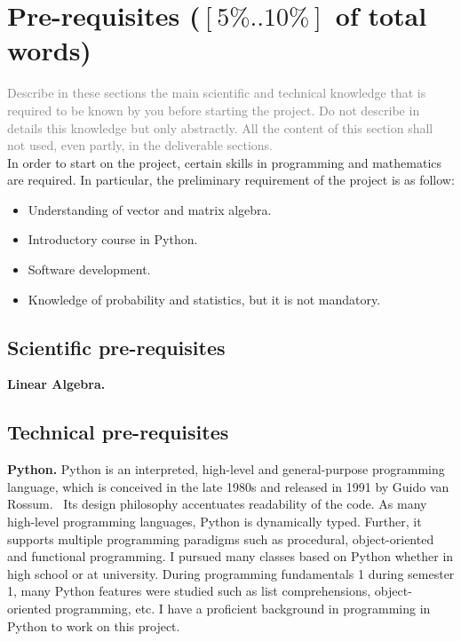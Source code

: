 \section{Pre-requisites ($[5\%..10\%]$ of total words)} 
\textcolor{gray}{Describe in these sections the main scientific and technical
  knowledge that is required to be known by you before starting the project.  Do
  not describe in details this knowledge but only abstractly. All the content of
  this section shall not used, even partly, in the deliverable sections.}\\

In order to start on the project, certain skills in programming
and mathematics are required. In particular, the preliminary requirement of
the project is as follow:
\begin{itemize}
        \item Understanding of vector and matrix algebra.
        \item Introductory course in Python.
        \item Software development.
        \item Knowledge of probability and statistics, but it is not
                mandatory.
\end{itemize}

\subsection{Scientific pre-requisites}

\textbf{Linear Algebra.}

\subsection{Technical pre-requisites}

\textbf{Python.} Python is an interpreted, high-level and general-purpose
programming language, which is conceived in the late 1980s and released in 1991
by Guido van Rossum.~\cite{PyRo} Its design philosophy accentuates readability
of the code.  As many high-level programming languages, Python is dynamically
typed. Further, it supports multiple programming paradigms such as procedural,
object-oriented and functional programming. I pursued many classes based on
Python whether in high school or at university. During programming fundamentals
1 during semester 1, many Python features were studied such as list
comprehensions, object-oriented programming, etc. I have  a proficient
background in programming in Python to work on this project.\\

